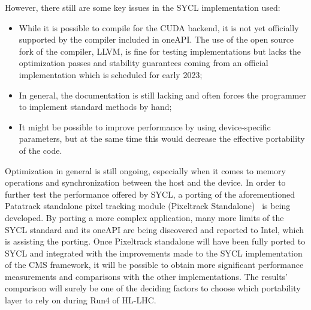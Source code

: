 However, there still are some key issues in the SYCL implementation used:
\begin{itemize}
    \item While it is possible to compile for the CUDA backend, it is not yet officially supported by the compiler included in oneAPI. The use of the open source fork of the compiler, LLVM, is fine for testing implementations but lacks the optimization passes and stability guarantees coming from an official implementation which is scheduled for early 2023;
    \item In general, the documentation is still lacking and often forces the programmer to implement standard methods by hand;
    \item It might be possible to improve performance by using device-specific parameters, but at the same time this would decrease the effective portability of the code.
\end{itemize}

Optimization in general is still ongoing, especially when it comes to memory operations and synchronization between the host and the device. In order to further test the performance offered by SYCL, a porting of the aforementioned Patatrack standalone pixel tracking module (Pixeltrack Standalone)~\cite{pixeltrack} is being developed. By porting a more complex application, many more limits of the SYCL standard and its oneAPI are being discovered and reported to Intel, which is assisting the porting. Once Pixeltrack standalone will have been fully ported to SYCL and integrated with the improvements made to the SYCL implementation of the CMS framework, it will be possible to obtain more significant performance measurements and comparisons with the other implementations. The results' comparison will surely be one of the deciding factors to choose which portability layer to rely on during Run4 of HL-LHC.